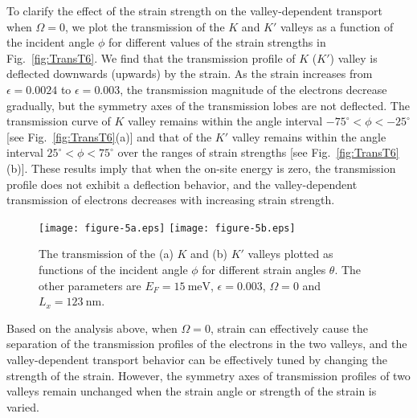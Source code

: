 \documentclass[reprint,amsmath,amssymb,aps,superscriptaddress]{revtex4-2}
\begin{document}
To clarify the effect of the strain strength on the valley-dependent transport when $\Omega=0$, we plot the transmission of the $K$ and $K'$ valleys
as a function of the incident angle $\phi$ for different values of the strain strengths in Fig.~\ref{fig:TransT6}.
We find that the transmission profile of $K$ ($K'$) valley is deflected downwards (upwards) by the strain. As the strain increases from $\epsilon=0.0024$ to $\epsilon=0.003$, the transmission magnitude of the electrons decrease gradually, but the symmetry axes of the transmission lobes are not deflected. The transmission curve of $K$ valley remains within the angle interval $ -75^\circ<\phi<-25^\circ$ [see Fig.~\ref{fig:TransT6}(a)] and that of the $K'$ valley remains within the angle interval $ 25^\circ<\phi<75^\circ$ over the ranges of strain strengths [see Fig.~\ref{fig:TransT6}(b)]. These results imply that when the on-site energy is zero, the transmission profile does not exhibit a deflection behavior, and the valley-dependent transmission of electrons decreases with increasing strain strength.
\begin{figure}[t]
	\centering
	\texttt{[image: figure-5a.eps]}%
	\texttt{[image: figure-5b.eps]}%
\caption{\label{fig:TransT5} The transmission of the (a) $K$ and (b) $K'$ valleys plotted as functions of the incident angle $\phi$ for different strain angles $\theta$. The other parameters are $E_F=15\ \mathrm{meV}$, $\epsilon=0.003$, $\Omega=0$ and $L_{x}=123\ \mathrm{nm}$.}
\end{figure}

Based on the analysis above, when $\Omega=0$, strain can effectively cause the separation of the transmission profiles of the electrons in the two valleys, and the valley-dependent transport behavior can be effectively tuned by changing the strength of the strain. However, the symmetry axes of transmission profiles of two valleys remain unchanged when the strain angle or strength of the strain is varied.
\end{document}
